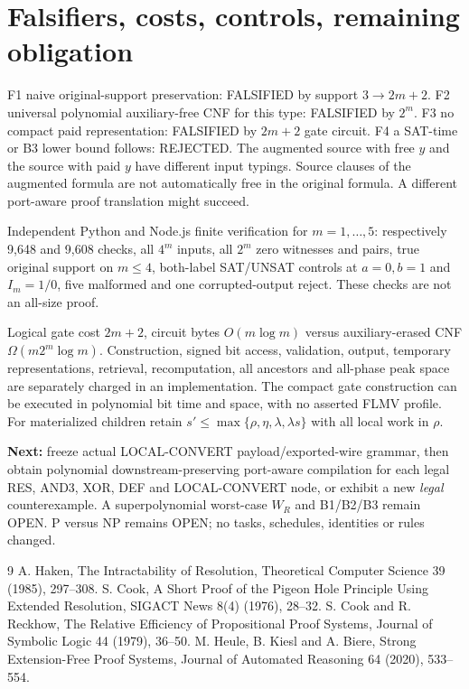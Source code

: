 \documentclass[11pt]{article}
\begin{document}
\section*{Falsifiers, costs, controls, remaining obligation}
F1 naive original-support preservation: FALSIFIED by support $3\to2m+2$. F2 universal polynomial auxiliary-free CNF for this type: FALSIFIED by $2^m$. F3 no compact paid representation: FALSIFIED by $2m+2$ gate circuit. F4 a SAT-time or B3 lower bound follows: REJECTED. The augmented source with free $y$ and the source with paid $y$ have different input typings. Source clauses of the augmented formula are not automatically free in the original formula. A different port-aware proof translation might succeed.
\par Independent Python and Node.js finite verification for $m=1,\dots,5$: respectively 9,648 and 9,608 checks, all $4^m$ inputs, all $2^m$ zero witnesses and pairs, true original support on $m\le4$, both-label SAT/UNSAT controls at $a=0,b=1$ and $I_m=1/0$, five malformed and one corrupted-output reject. These checks are not an all-size proof.
\par Logical gate cost $2m+2$, circuit bytes $O(m\log m)$ versus auxiliary-erased CNF $\Omega(m2^m\log m)$. Construction, signed bit access, validation, output, temporary representations, retrieval, recomputation, all ancestors and all-phase peak space are separately charged in an implementation. The compact gate construction can be executed in polynomial bit time and space, with no asserted FLMV profile. For materialized children retain $s'\le\max\{\rho,\eta,\lambda,\lambda s\}$ with all local work in $\rho$.
\par\noindent\textbf{Next:} freeze actual LOCAL-CONVERT payload/exported-wire grammar, then obtain polynomial downstream-preserving port-aware compilation for each legal RES, AND3, XOR, DEF and LOCAL-CONVERT node, or exhibit a new \emph{legal} counterexample. A superpolynomial worst-case $W_R$ and B1/B2/B3 remain OPEN. P versus NP remains OPEN; no tasks, schedules, identities or rules changed.
\begin{thebibliography}{9}
 A. Haken, The Intractability of Resolution, Theoretical Computer Science 39 (1985), 297--308.
 S. Cook, A Short Proof of the Pigeon Hole Principle Using Extended Resolution, SIGACT News 8(4) (1976), 28--32.
 S. Cook and R. Reckhow, The Relative Efficiency of Propositional Proof Systems, Journal of Symbolic Logic 44 (1979), 36--50.
 M. Heule, B. Kiesl and A. Biere, Strong Extension-Free Proof Systems, Journal of Automated Reasoning 64 (2020), 533--554.
\end{thebibliography}
\end{document}
